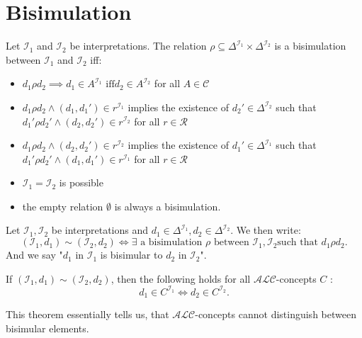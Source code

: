 \section{Bisimulation}
\begin{definition}
	Let $\mathcal{I}_1$ and $\mathcal{I}_2$ be interpretations.
	The relation $ \rho \subseteq \Delta^{\mathcal{I}_{1}} \times \Delta^{\mathcal{I}_2}$ is a bisimulation between $\mathcal{I}_1$ and $\mathcal{I}_2$ iff:
	\begin{itemize}
		\item $d_1 \rho d_2 \implies d_1 \in A^{\mathcal{I}_1} \text{ iff} d_2 \in A^{\mathcal{I}_2}$ for all $A \in \mathscr{C}$ 
		\item $d_1 \rho d_2 \land  (d_1, d_1') \in r^{\mathcal{I}_1}$ implies the existence of $d_2' \in \Delta^{\mathcal{I}_2}$ such that
			$d_1' \rho d_2' \land (d_2, d_2') \in r^{\mathcal{I}_2}$ for all $r \in \mathscr{R}$
		\item $d_1 \rho d_2 \land  (d_2, d_2') \in r^{\mathcal{I}_2}$ implies the existence of $d_1' \in \Delta^{\mathcal{I}_1}$ such that
			$d_1' \rho d_2' \land (d_1, d_1') \in r^{\mathcal{I}_1}$ for all $r \in \mathscr{R}$
	\end{itemize}
\end{definition}

\begin{note}
	\begin{itemize}
		\item $\mathcal{I}_1 = \mathcal{I}_2$ is possible
		\item the empty relation $\emptyset$ is always a bisimulation.
	\end{itemize}
\end{note}

\begin{notation}
	Let $\mathcal{I}_1, \mathcal{I}_2$ be interpretations and $d_1 \in \Delta^{\mathcal{I}_1}, d_2 \in \Delta^{\mathcal{I}_2}$.
	We then write:
	\[
		\left( \mathcal{I}_1, d_1 \right) \sim \left( \mathcal{I}_2, d_2 \right) \iff \exists \text{ a bisimulation $\rho$ between  $\mathcal{I}_1, \mathcal{I}_2$
		such that $d_1 \rho d_2$}
	.\]
	And we say "$d_1$ in $\mathcal{I}_1$ is bisimular to $d_2$ in $\mathcal{I}_2$".
\end{notation}

\begin{theorem}\label{thm: bisimulation invariance}
	If $ \left( \mathcal{I}_1,d_1 \right) \sim \left( \mathcal{I}_2, d_2 \right)$, then the following holds for all $\mathcal{ALC}$-concepts $C$ :
	\[
		d_1 \in C^{\mathcal{I}_1} \iff d_2 \in C^{\mathcal{I}_2}
	.\]
\end{theorem}
This theorem essentially tells us, that $\mathcal{ALC}$-concepts cannot distinguish between bisimular elements.

